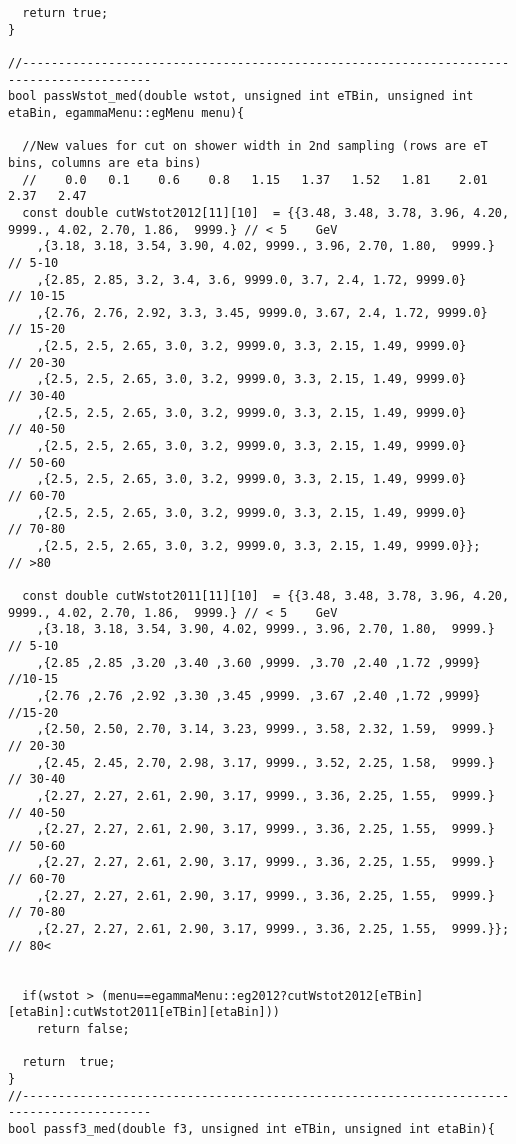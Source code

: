 \begin{lstlisting}
  return true;
}

//----------------------------------------------------------------------------------------
bool passWstot_med(double wstot, unsigned int eTBin, unsigned int etaBin, egammaMenu::egMenu menu){
  
  //New values for cut on shower width in 2nd sampling (rows are eT bins, columns are eta bins)
  //    0.0   0.1    0.6    0.8   1.15   1.37   1.52   1.81    2.01   2.37   2.47
  const double cutWstot2012[11][10]  = {{3.48, 3.48, 3.78, 3.96, 4.20, 9999., 4.02, 2.70, 1.86,  9999.} // < 5    GeV
	,{3.18, 3.18, 3.54, 3.90, 4.02, 9999., 3.96, 2.70, 1.80,  9999.} // 5-10   
	,{2.85, 2.85, 3.2, 3.4, 3.6, 9999.0, 3.7, 2.4, 1.72, 9999.0}     // 10-15
	,{2.76, 2.76, 2.92, 3.3, 3.45, 9999.0, 3.67, 2.4, 1.72, 9999.0}  // 15-20
	,{2.5, 2.5, 2.65, 3.0, 3.2, 9999.0, 3.3, 2.15, 1.49, 9999.0}     // 20-30
	,{2.5, 2.5, 2.65, 3.0, 3.2, 9999.0, 3.3, 2.15, 1.49, 9999.0}     // 30-40
	,{2.5, 2.5, 2.65, 3.0, 3.2, 9999.0, 3.3, 2.15, 1.49, 9999.0}     // 40-50
	,{2.5, 2.5, 2.65, 3.0, 3.2, 9999.0, 3.3, 2.15, 1.49, 9999.0}     // 50-60
	,{2.5, 2.5, 2.65, 3.0, 3.2, 9999.0, 3.3, 2.15, 1.49, 9999.0}     // 60-70
	,{2.5, 2.5, 2.65, 3.0, 3.2, 9999.0, 3.3, 2.15, 1.49, 9999.0}     // 70-80
	,{2.5, 2.5, 2.65, 3.0, 3.2, 9999.0, 3.3, 2.15, 1.49, 9999.0}};   // >80
  
  const double cutWstot2011[11][10]  = {{3.48, 3.48, 3.78, 3.96, 4.20, 9999., 4.02, 2.70, 1.86,  9999.} // < 5    GeV
	,{3.18, 3.18, 3.54, 3.90, 4.02, 9999., 3.96, 2.70, 1.80,  9999.} // 5-10   
	,{2.85 ,2.85 ,3.20 ,3.40 ,3.60 ,9999. ,3.70 ,2.40 ,1.72 ,9999}  //10-15
	,{2.76 ,2.76 ,2.92 ,3.30 ,3.45 ,9999. ,3.67 ,2.40 ,1.72 ,9999}  //15-20
	,{2.50, 2.50, 2.70, 3.14, 3.23, 9999., 3.58, 2.32, 1.59,  9999.} // 20-30  
	,{2.45, 2.45, 2.70, 2.98, 3.17, 9999., 3.52, 2.25, 1.58,  9999.} // 30-40  
	,{2.27, 2.27, 2.61, 2.90, 3.17, 9999., 3.36, 2.25, 1.55,  9999.} // 40-50  
	,{2.27, 2.27, 2.61, 2.90, 3.17, 9999., 3.36, 2.25, 1.55,  9999.} // 50-60  
	,{2.27, 2.27, 2.61, 2.90, 3.17, 9999., 3.36, 2.25, 1.55,  9999.} // 60-70  
	,{2.27, 2.27, 2.61, 2.90, 3.17, 9999., 3.36, 2.25, 1.55,  9999.} // 70-80  
	,{2.27, 2.27, 2.61, 2.90, 3.17, 9999., 3.36, 2.25, 1.55,  9999.}};  // 80<    


  if(wstot > (menu==egammaMenu::eg2012?cutWstot2012[eTBin][etaBin]:cutWstot2011[eTBin][etaBin]))
    return false;
    
  return  true;
}
//----------------------------------------------------------------------------------------
bool passf3_med(double f3, unsigned int eTBin, unsigned int etaBin){
  

\end{lstlisting}
